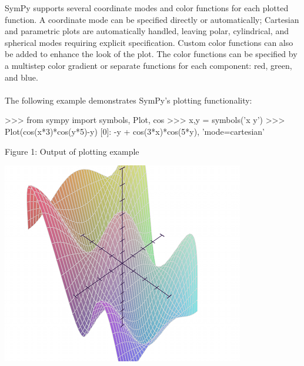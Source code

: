 \documentclass[11pt,a4paper,oneside]{report}
\begin{document}
SymPy supports several coordinate modes and color functions for each plotted function. A coordinate mode can be specified directly or automatically; Cartesian and parametric plots are automatically handled, leaving polar, cylindrical, and spherical modes requiring explicit specification. Custom color functions can also be added to enhance the look of the plot. The color functions can be specified by a multistep color gradient or separate functions for each component: red, green, and blue.\\\\
The following example demonstrates SymPy’s plotting functionality:
\begin{verbatimtab}
>>> from sympy import symbols, Plot, cos
>>> x,y = symbols('x y')
>>> Plot(cos(x*3)*cos(y*5)-y)
[0]: -y + cos(3*x)*cos(5*y), 'mode=cartesian'
\end{verbatimtab}
Figure 1: Output of plotting example
\begin{flushleft}
\begin{normalsize}
\includegraphics{plot.jpg}
\end{normalsize}
\end{flushleft}
\end{document}

